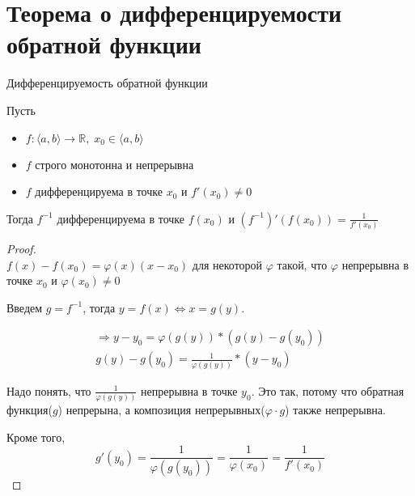 \section{Теорема о дифференцируемости обратной функции \href{https://youtu.be/OXDjegAsmSU?t=3328}{\Walley}}
\begin{theorem-non}
    Дифференцируемость обратной функции

    Пусть
    \begin{itemize}
        \item $f: \langle a, b \rangle \to \mathbb{R}, \; x_0 \in \langle a, b \rangle$
        \item $f$ строго монотонна и непрерывна
        \item $f$ дифференцируема в точке $x_0$ и $f'(x_0) \neq 0$
    \end{itemize}

    Тогда $f^{-1}$ дифференцируема в точке $f(x_0)$ и $(f^{-1})'(f(x_0)) = \frac{1}{f'(x_0)}$
\end{theorem-non}
\begin{proof} \quad \\
    $f(x) - f(x_0) = \varphi(x)(x - x_0)$ для некоторой $\varphi$ такой, что $\varphi$ непрерывна в точке $x_0$ и $\varphi(x_0) \neq 0$

    Введем $g = f^{-1}$, тогда $y = f(x) \Leftrightarrow x = g(y)$.

    \begin{gather*}
        \Rightarrow y - y_0 = \varphi(g(y)) * (g(y) - g(y_0)) \\
        g(y) - g(y_0) = \frac{1}{\varphi(g(y))} * (y - y_0)
    \end{gather*}

    Надо понять, что $\frac{1}{\varphi(g(y))}$ непрерывна в точке $y_0$. Это так, потому что обратная функция($g$) непрерына, а композиция непрерывных($\varphi \cdot g$) также непрерывна.

    Кроме того,
    \[ g'(y_0) = \frac{1}{\varphi(g(y_0))} = \frac{1}{\varphi(x_0)} = \frac{1}{f'(x_0)} \]
\end{proof}